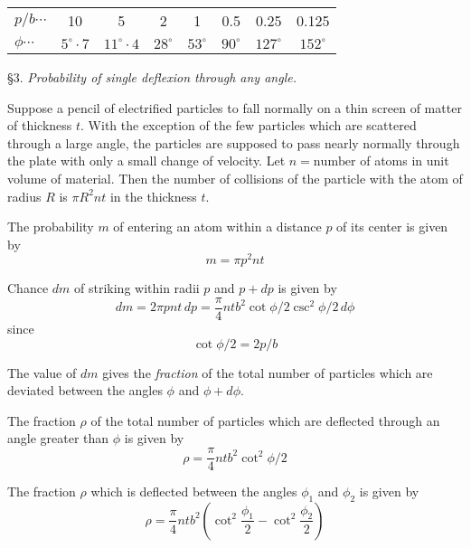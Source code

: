 \documentclass[12pt]{article}
\begin{document}
\begin{center}
\begin{tabular}{lccccccc}
$p/b\cdots$ & 10 & 5 & 2 & 1 & 0.5 & 0.25 & 0.125
\\
$\phi\cdots$ & $5^\circ\cdot7$ & $11^\circ\cdot4$ & $28^\circ$ & $53^\circ$ & $90^\circ$ & $127^\circ$ & $152^\circ$
\end{tabular}
\end{center}

\S 3. {\it Probability of single deflexion through any angle.}

\bigskip
Suppose a pencil of electrified particles to fall normally on a thin screen of matter of thickness $t$.
With the exception of the few particles which are scattered through a large angle,
the particles are supposed to pass nearly normally through the plate with only a small change of velocity.
Let $n=\text{number}$ of atoms in unit volume of material.
Then the number of collisions of the particle with the atom of radius $R$ is $\pi R^2nt$
in the thickness $t$.

\bigskip
The probability $m$ of entering an atom within a distance $p$ of its center is given by
\begin{equation*}
m=\pi p^2nt
\end{equation*}

Chance $dm$ of striking within radii $p$ and $p+dp$ is given by
\begin{equation*}
dm=2\pi pnt\,dp=\frac{\pi}{4}ntb^2\cot\phi/2\csc^2\phi/2\,d\phi
\tag{2}
\end{equation*}
since
\begin{equation*}
\cot\phi/2=2p/b
\end{equation*}

The value of $dm$ gives the {\it fraction} of the total number of particles
which are deviated between the angles $\phi$ and $\phi+d\phi$.

\bigskip
The fraction $\rho$ of the total number of particles which are deflected through an angle greater than $\phi$ is given by
\begin{equation*}
\rho=\frac{\pi}{4}ntb^2\cot^2\phi/2
\tag{3}
\end{equation*}

The fraction $\rho$ which is deflected between the angles $\phi_1$ and $\phi_2$ is given by
\begin{equation*}
\rho=\frac{\pi}{4}ntb^2
\left(\cot^2\frac{\phi_1}{2}-\cot^2\frac{\phi_2}{2}\right)
\tag{4}
\end{equation*}
\end{document}
